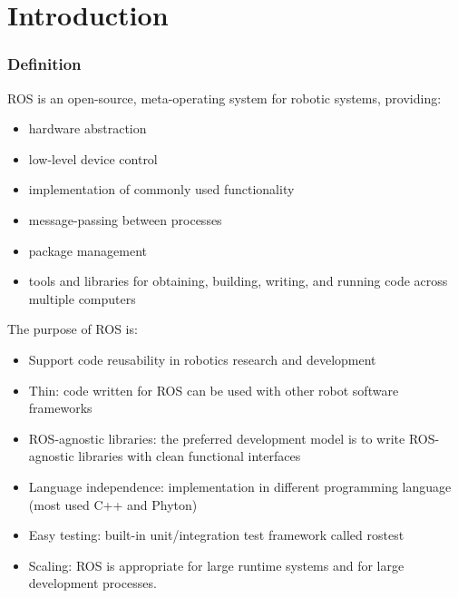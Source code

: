 \part{Introduction}

    \section{Definition}
        ROS is an open-source, meta-operating system for robotic systems, providing:
        \begin{itemize}
            \item hardware abstraction
            \item low-level device control
            \item implementation of commonly used functionality
            \item message-passing between processes
            \item package management
            \item tools and libraries for obtaining, building, writing, and running code across multiple computers
        \end{itemize}
        The purpose of ROS is:
        \begin{itemize}
            \item Support code reusability in robotics research and development
            \item Thin: code written for ROS can be used with other robot software frameworks
            \item ROS-agnostic libraries: the preferred development model is to write ROS-agnostic libraries with clean functional interfaces
            \item Language independence: implementation in different programming language (most used C++ and Phyton)
            \item Easy testing: built-in unit/integration test framework called rostest
            \item Scaling: ROS is appropriate for large runtime systems and for large development processes.
        \end{itemize}


